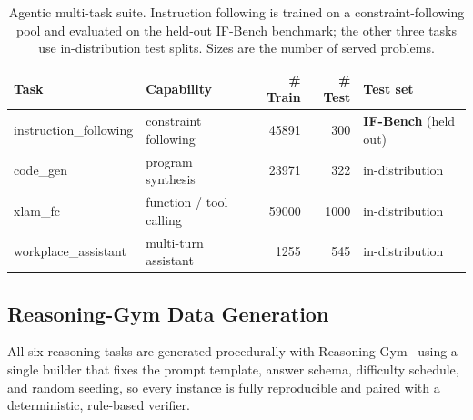 \begin{table}[htbp]
\centering
\small
\setlength{\tabcolsep}{8pt}
\begin{tabular}{@{}llrrl@{}}
\toprule
Task & Capability & \# Train & \# Test & Test set \\
\midrule
instruction\_following & constraint following   & 45891 & 300 & \textbf{IF-Bench} (held out) \\
code\_gen              & program synthesis      & 23971 & 322 & in-distribution \\
xlam\_fc               & function / tool calling& 59000 & 1000& in-distribution \\
workplace\_assistant   & multi-turn assistant   & 1255  & 545 & in-distribution \\
\bottomrule
\end{tabular}
\caption{Agentic multi-task suite. Instruction following is trained on a constraint-following
pool and evaluated on the held-out IF-Bench benchmark; the other three tasks use in-distribution
test splits. Sizes are the number of served problems.}
\label{tab:agentic}
\end{table}

\subsection{Reasoning-Gym Data Generation}
\label{app:rg-generation}

All six reasoning tasks are generated procedurally with Reasoning-Gym~\citep{reasoninggym}
using a single builder that fixes the prompt template, answer schema, difficulty schedule, and
random seeding, so every instance is fully reproducible and paired with a deterministic,
rule-based verifier.

